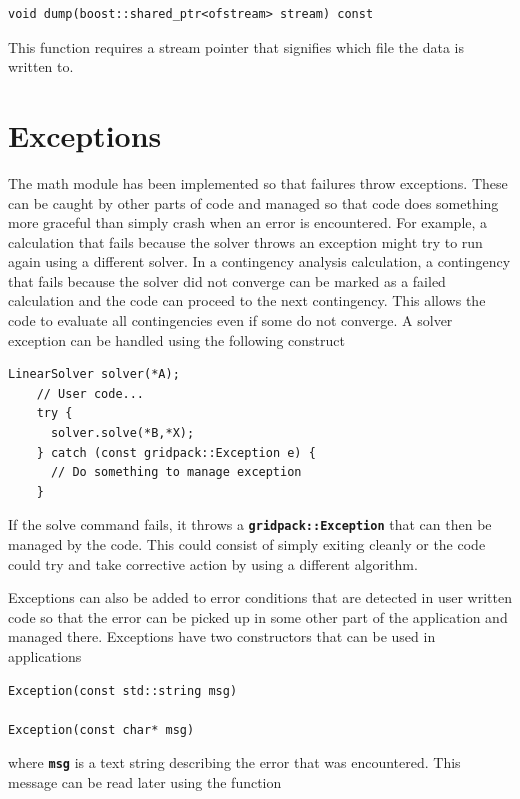 \documentclass[12pt]{report} %
\begin{document}
{
\color{red}
\begin{Verbatim}[fontseries=b]
void dump(boost::shared_ptr<ofstream> stream) const
\end{Verbatim}
}

This function requires a stream pointer that signifies which file the data is written to.

\section{Exceptions}

The math module has been implemented so that failures throw exceptions. These can be caught by other parts of code and managed so that code does something more graceful than simply crash when an error is encountered. For example, a calculation that fails because the solver throws an exception might try to run again using a different solver. In a contingency analysis calculation, a contingency that fails because the solver did not converge can be marked as a failed calculation and the code can proceed to the next contingency. This allows the code to evaluate all contingencies even if some do not converge. A solver exception can be handled using the following construct

{
\color{red}
\begin{Verbatim}[fontseries=b]
    LinearSolver solver(*A);
    // User code...
    try {
      solver.solve(*B,*X);
    } catch (const gridpack::Exception e) {
      // Do something to manage exception
    }
\end{Verbatim}
}

If the solve command fails, it throws a \texttt{\textbf{gridpack::Exception}} that can then be managed by the code. This could consist of simply exiting cleanly or the code could try and take corrective action by using a different algorithm.

Exceptions can also be added to error conditions that are detected in user written code so that the error can be picked up in some other part of the application and managed there. Exceptions have two constructors that can be used in applications

{
\color{red}
\begin{Verbatim}[fontseries=b]
Exception(const std::string msg)

Exception(const char* msg)
\end{Verbatim}
}

where \texttt{\textbf{msg}} is a text string describing the error that was encountered. This message can be read later using the function
\end{document}

